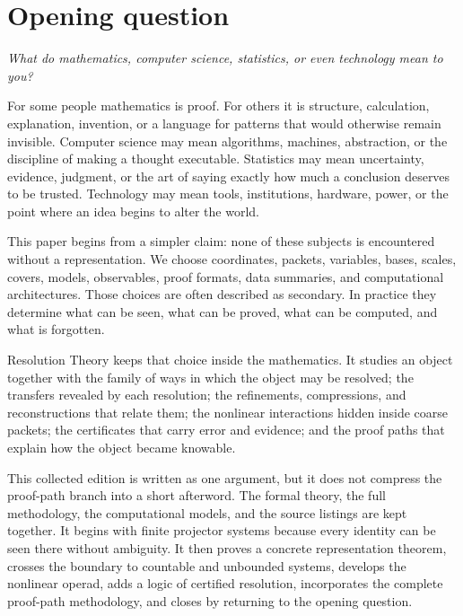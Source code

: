 \documentclass[11pt,oneside]{book}
\theoremstyle{remark}
\begin{document}
\chapter*{Opening question}
\begin{center}
\Large\itshape What do mathematics, computer science, statistics, or even technology mean to you?
\end{center}

For some people mathematics is proof.  For others it is structure, calculation, explanation, invention, or a language for patterns that would otherwise remain invisible.  Computer science may mean algorithms, machines, abstraction, or the discipline of making a thought executable.  Statistics may mean uncertainty, evidence, judgment, or the art of saying exactly how much a conclusion deserves to be trusted.  Technology may mean tools, institutions, hardware, power, or the point where an idea begins to alter the world.

This paper begins from a simpler claim: none of these subjects is encountered without a representation.  We choose coordinates, packets, variables, bases, scales, covers, models, observables, proof formats, data summaries, and computational architectures.  Those choices are often described as secondary.  In practice they determine what can be seen, what can be proved, what can be computed, and what is forgotten.

Resolution Theory keeps that choice inside the mathematics.  It studies an object together with the family of ways in which the object may be resolved; the transfers revealed by each resolution; the refinements, compressions, and reconstructions that relate them; the nonlinear interactions hidden inside coarse packets; the certificates that carry error and evidence; and the proof paths that explain how the object became knowable.

This collected edition is written as one argument, but it does not compress the proof-path branch into a short afterword.  The formal theory, the full methodology, the computational models, and the source listings are kept together.  It begins with finite projector systems because every identity can be seen there without ambiguity.  It then proves a concrete representation theorem, crosses the boundary to countable and unbounded systems, develops the nonlinear operad, adds a logic of certified resolution, incorporates the complete proof-path methodology, and closes by returning to the opening question.
\end{document}
